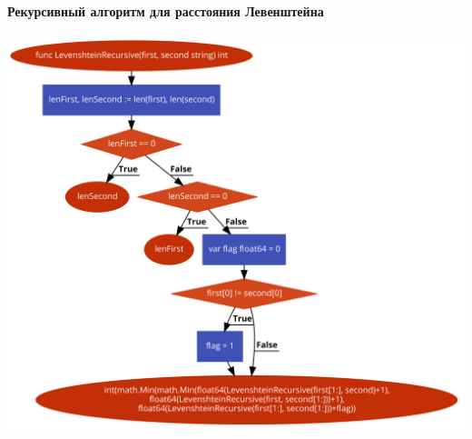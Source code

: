 \documentclass[utf8x, 12pt]{G7-32} %
\begin{document}
\paragraph{Рекурсивный алгоритм для расстояния Левенштейна}
\begin{center}
	\includegraphics[scale=0.32]{images/levenshteinRecursive.png}
\end{center}

\newpage
\end{document}
